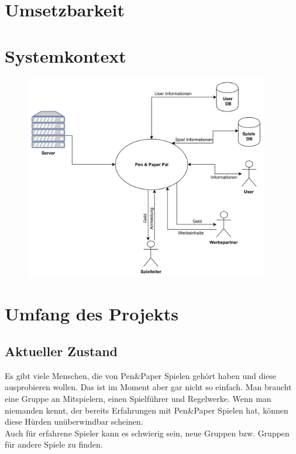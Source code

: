 \documentclass[DIV=13, 10pt,a4paper]{scrartcl}
\begin{document}
\section{Umsetzbarkeit}


\section{Systemkontext}
\begin{figure}[h!]
	\centering
	\includegraphics[width = 0.95\textwidth]{docs/0_Sonstiges/03_03_Systemkontext.jpg}
	\label{fig:SystemKontext}
 \end{figure}



\section{Umfang des Projekts}
	\subsection*{Aktueller Zustand}
	Es gibt viele Menschen, die von Pen\&Paper Spielen gehört haben und diese ausprobieren wollen. Das ist im Moment aber gar nicht so einfach. Man braucht eine Gruppe an Mitspielern, einen Spielführer und Regelwerke. Wenn man niemanden kennt, der bereits Erfahrungen mit Pen\&Paper Spielen hat, können diese Hürden unüberwindbar scheinen.\\
	Auch für erfahrene Spieler kann es schwierig sein, neue Gruppen bzw. Gruppen für andere Spiele zu finden. 	
\end{document}
